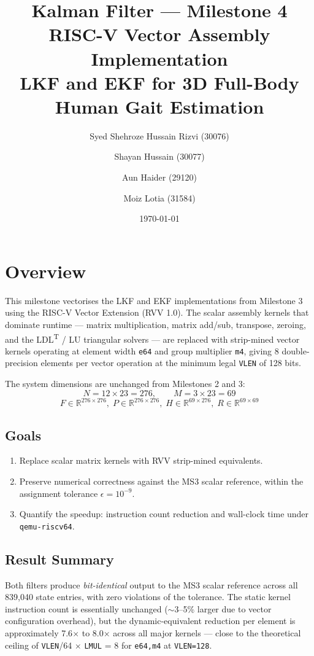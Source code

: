 \documentclass[11pt,a4paper]{article}
\title{
    \large Kalman Filter --- Milestone 4 \\[0.4em]
    \LARGE RISC-V Vector Assembly Implementation \\[0.2em]
    \large LKF and EKF for 3D Full-Body Human Gait Estimation
}
\author{
    Syed Shehroze Hussain Rizvi (30076) \and
    Shayan Hussain (30077) \and
    Aun Haider (29120) \and
    Moiz Lotia (31584)
}
\date{\today}
\begin{document}
\maketitle

\tableofcontents
\newpage

\section{Overview}

This milestone vectorises the LKF and EKF implementations from Milestone 3
using the RISC-V Vector Extension (RVV 1.0). The scalar assembly kernels
that dominate runtime --- matrix multiplication, matrix add/sub, transpose,
zeroing, and the LDL\textsuperscript{T} / LU triangular solvers --- are
replaced with strip-mined vector kernels operating at element width
\texttt{e64} and group multiplier \texttt{m4}, giving 8 double-precision
elements per vector operation at the minimum legal \texttt{VLEN} of 128 bits.

The system dimensions are unchanged from Milestones 2 and 3:
\[
N = 12 \times 23 = 276, \qquad M = 3 \times 23 = 69
\]
\[
F \in \mathbb{R}^{276\times276},\;
P \in \mathbb{R}^{276\times276},\;
H \in \mathbb{R}^{69\times276},\;
R \in \mathbb{R}^{69\times69}
\]

\subsection{Goals}

\begin{enumerate}
    \item Replace scalar matrix kernels with RVV strip-mined equivalents.
    \item Preserve numerical correctness against the MS3 scalar reference,
          within the assignment tolerance $\epsilon = 10^{-9}$.
    \item Quantify the speedup: instruction count reduction and wall-clock
          time under \texttt{qemu-riscv64}.
\end{enumerate}

\subsection{Result Summary}

Both filters produce \emph{bit-identical} output to the MS3 scalar reference
across all 839{,}040 state entries, with zero violations of the tolerance.
The static kernel instruction count is essentially unchanged
($\sim$3--5\% larger due to vector configuration overhead), but the
dynamic-equivalent reduction per element is approximately 7.6$\times$ to
8.0$\times$ across all major kernels --- close to the theoretical ceiling of
\texttt{VLEN}/64 $\times$ \texttt{LMUL} = $8$ for \texttt{e64,m4} at
\texttt{VLEN=128}.
\end{document}
